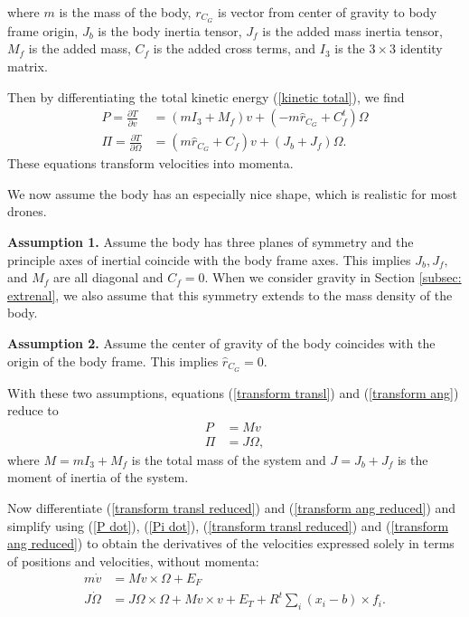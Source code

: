 \documentclass{aims}
\theoremstyle{definition}
\begin{document}
where
$m$ is the mass of the body, 
$r_{C_G}$ is vector from center of gravity to body frame origin, 
$J_b$ is the body inertia tensor, 
$J_f$ is the added mass inertia tensor,
$M_f$ is the added mass, 
$C_f$ is the added cross terms, and
$I_3$ is the $3 \times 3$ identity matrix.


Then by differentiating the total kinetic energy (\ref{kinetic total}), we find
\begin{align}
P=\frac{\partial T}{\partial v} &= (mI_3+M_f)v +(-m\hat{r}_{C_G} +C_f^t)\Omega  \label{transform transl}\\
\Pi=\frac{\partial T}{\partial \Omega} &= ( m\hat{r}_{C_G} +C_f)v + (J_b +J_f)\Omega.\label{transform ang}
\end{align}
These equations transform velocities into momenta.

We now assume the body has an especially nice shape, which is realistic for most drones.

\textbf{Assumption 1.}  Assume the body has three planes of symmetry and the principle axes of inertial coincide with the body frame axes.  This implies $J_b, J_f,$ and $M_f$ are all diagonal and $C_f =0$.
When we consider gravity in Section \ref{subsec: extrenal}, we also assume that this symmetry extends to the mass density of the body.

\textbf{Assumption 2.}  Assume the center of gravity of the body coincides with the origin of the body frame.  This implies $\hat{r}_{C_G} =0$.


With these two assumptions, equations (\ref{transform transl}) and (\ref{transform ang}) reduce to
\begin{align}
P &= Mv  \label{transform transl reduced}  \\
\Pi &= J\Omega,  \label{transform ang reduced} 
\end{align}
where 
$M=mI_3 +M_f$ is the total mass of the system and 
$J= J_b +J_f$ is the moment of inertia of the system.

Now differentiate (\ref{transform transl reduced}) and (\ref{transform ang reduced}) and simplify using (\ref{P dot}), (\ref{Pi dot}), (\ref{transform transl reduced}) and (\ref{transform ang reduced}) to obtain the derivatives of the velocities expressed solely in terms of positions and velocities, without momenta:
\begin{align}
m\dot{v} &= Mv \times \Omega + E_F \label{eqn of motion transl} \\
J\dot{\Omega} &= J\Omega \times \Omega + Mv \times v +  E_T + R^t\sum_i(x_i-b) \times f_i.\label{eqn of motion ang}
\end{align}
\end{document}
